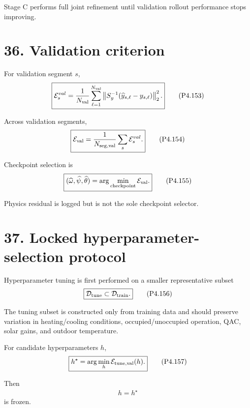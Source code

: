 \documentclass[11pt]{article}
\begin{document}
Stage C performs full joint refinement until validation rollout performance stops improving.

\section*{36. Validation criterion}

For validation segment \(s\),
\begin{align}
\boxed{
\mathcal E_s^{val}
=
\frac{1}{N_{\rm val}}
\sum_{\ell=1}^{N_{\rm val}}
\left\|
S_y^{-1}
(\widehat y_{s,\ell}-y_{s,\ell})
\right\|_2^2.
}
\tag{P4.153}
\end{align}

Across validation segments,
\begin{align}
\boxed{
\mathcal E_{\rm val}
=
\frac{1}{N_{\rm seg,val}}
\sum_s\mathcal E_s^{val}.
}
\tag{P4.154}
\end{align}

Checkpoint selection is
\begin{align}
\boxed{
(\widehat\omega,\widehat\psi,\widehat\theta)
=
\arg\min_{\rm checkpoint}
\mathcal E_{\rm val}.
}
\tag{P4.155}
\end{align}

Physics residual is logged but is not the sole checkpoint selector.

\section*{37. Locked hyperparameter-selection protocol}

Hyperparameter tuning is first performed on a smaller representative subset
\begin{align}
\boxed{
\mathcal D_{\rm tune}\subset\mathcal D_{\rm train}.
}
\tag{P4.156}
\end{align}

The tuning subset is constructed only from training data and should preserve variation in heating/cooling conditions, occupied/unoccupied operation, QAC, solar gains, and outdoor temperature.

For candidate hyperparameters \(h\),
\begin{align}
\boxed{
h^\star
=
\arg\min_h
\mathcal E_{\rm tune,val}(h).
}
\tag{P4.157}
\end{align}

Then
\begin{align}
\boxed{h=h^\star}
\tag{P4.158}
\end{align}
is frozen.
\end{document}
